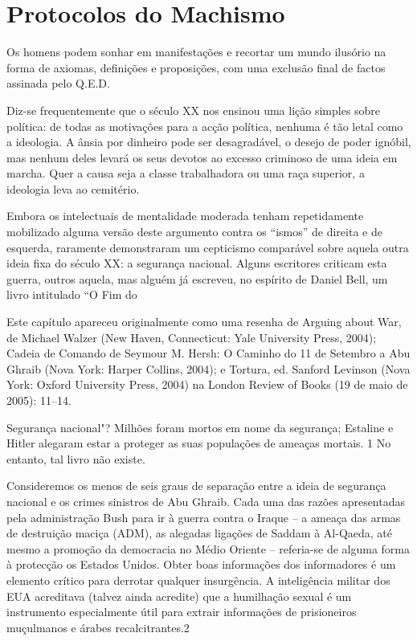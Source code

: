 \chapter{Protocolos do Machismo}\label{Protocolos do Machismo}
 \par 
Os homens podem sonhar em manifestações e recortar um mundo ilusório na forma de axiomas, definições e proposições, com uma exclusão final de factos assinada pelo Q.E.D.
 \par 
Diz-se frequentemente que o século XX nos ensinou uma lição simples sobre política: de todas as motivações para a acção política, nenhuma é tão letal como a ideologia. A ânsia por dinheiro pode ser desagradável, o desejo de poder ignóbil, mas nenhum deles levará os seus devotos ao excesso criminoso de uma ideia em marcha. Quer a causa seja a classe trabalhadora ou uma raça superior, a ideologia leva ao cemitério.
 \par 
Embora os intelectuais de mentalidade moderada tenham repetidamente mobilizado alguma versão deste argumento contra os “ismos” de direita e de esquerda, raramente demonstraram um cepticismo comparável sobre aquela outra ideia fixa do século XX: a segurança nacional. Alguns escritores criticam esta guerra, outros aquela, mas alguém já escreveu, no espírito de Daniel Bell, um livro intitulado “O Fim do
 \par 
Este capítulo apareceu originalmente como uma resenha de Arguing about War, de Michael Walzer (New Haven, Connecticut: Yale University Press, 2004); Cadeia de Comando de Seymour M. Hersh: O Caminho do {\color{blue}11} de Setembro a Abu Ghraib (Nova York: Harper Collins, 2004); e Tortura, ed. Sanford Levinson (Nova York: Oxford University Press, 2004) na London Review of Books (19 de maio de 2005): 11–14.
 \par 
Segurança nacional"? Milhões foram mortos em nome da segurança; Estaline e Hitler alegaram estar a proteger as suas populações de ameaças mortais. {\color{blue}1} No entanto, tal livro não existe.
 \par 
Consideremos os menos de seis graus de separação entre a ideia de segurança nacional e os crimes sinistros de Abu Ghraib. Cada uma das razões apresentadas pela administração Bush para ir à guerra contra o Iraque – a ameaça das armas de destruição maciça (ADM), as alegadas ligações de Saddam à Al-Qaeda, até mesmo a promoção da democracia no Médio Oriente – referia-se de alguma forma à protecção os Estados Unidos. Obter boas informações dos informadores é um elemento crítico para derrotar qualquer insurgência. A inteligência militar dos EUA acreditava (talvez ainda acredite) que a humilhação sexual é um instrumento especialmente útil para extrair informações de prisioneiros muçulmanos e árabes recalcitrantes.{\color{blue}2}

